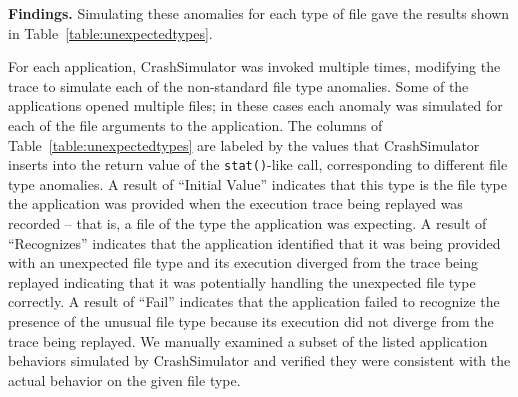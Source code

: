 
{\bf Findings.}
Simulating these anomalies for each type of file
gave the results shown in Table~\ref{table:unexpectedtypes}. 


For each application, CrashSimulator was invoked multiple times,
modifying the trace to simulate each of the non-standard file type anomalies.
Some of the applications opened multiple files; in these cases each
anomaly was simulated for each of the file arguments to the application.
The columns of Table~\ref{table:unexpectedtypes} 
are labeled by the values that CrashSimulator inserts into
the return value of the {\tt stat()}-like call, corresponding to
different file type anomalies.
A result of ``Initial Value''
indicates that this type is the file type the application was provided when the
execution trace being replayed was recorded -- that is, a file of the type the
application was expecting.  A result of ``Recognizes'' indicates that the
application identified that it was being provided with an unexpected file type
and its execution diverged from the trace being replayed indicating that it was
potentially handling the unexpected file type correctly.  A result of ``Fail''
indicates that the application failed to recognize the presence of the unusual
file type because its execution did not diverge from the trace being replayed.
We manually examined a subset of the listed application behaviors simulated by
CrashSimulator and verified they were consistent with the actual behavior on the
given file type.

